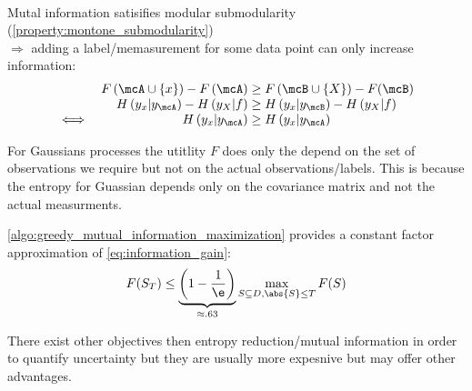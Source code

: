 \begin{corbox}\nospacing
  \begin{cor}\label{cor:diminishing_returns_property}\leavevmode\\
    Mutal information satisifies modular submodularity (\cref{property:montone_submodularity})\\
    $\Rightarrow$ adding a label/memasurement for some data point can only increase information:
    \begin{alignat*}{3}
      &&F \left(\mcA\cup \left\{x\right\}\right)-F \left(\mcA\right)
      &\geq F \left(\mcB\cup \left\{X\right\}\right)-F(\mcB)\\[-1\jot]
      &&H\left(y_x|y_{\mcA}\right)-H \left(y_X|f\right)&\geq H\left(y_x|y_{\mcB}\right)-H \left(y_X|f\right)\\[-1\jot]
      \iff&&H\left(y_x|y_{\mcA}\right)&\geq H\left(y_x|y_{\mcA}\right)
    \end{alignat*}
  \end{cor}
\end{corbox}
\begin{notebox}[Note]\nospacing
  For Gaussians processes the utitlity $F$ does only the depend on the set of observations we require but
  not on the actual observations/labels.
  This is because the entropy for Guassian depends only on the covariance matrix and not the actual measurments.
\end{notebox}
\begin{corbox}\nospacing
  \begin{cor}\label{cor:constant_factor_approximation}
    \cref{algo:greedy_mutual_information_maximization} provides a constant factor approximation of
    \cref{eq:information_gain}:
    \begin{align}
      F(S_T)\leq\underbrace{\left(1-\frac{1}{\e}\right)}_{\approx.63}\max_{S\subseteq D,\abs{S}\leq T}F(S)
    \end{align}
  \end{cor}
\end{corbox}
\begin{notebox}[Note]\nospacing
  There exist other objectives then entropy reduction/mutual information in order to quantify uncertainty but they
  are usually more expesnive but may offer other advantages.
\end{notebox}

